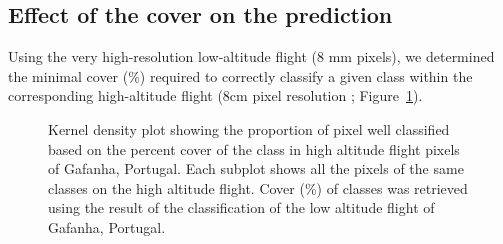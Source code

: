 \documentclass[
  number]{elsarticle}
\begin{document}
\subsection{Effect of the cover on the
prediction}\label{effect-of-the-cover-on-the-prediction}

Using the very high-resolution low-altitude flight (8 mm pixels), we
determined the minimal cover (\%) required to correctly classify a given
class within the corresponding high-altitude flight (8cm pixel
resolution ; Figure~\ref{fig-upscaling}).

\label{cell-fig-upscaling}
\begin{figure}[H]


\caption{\label{fig-upscaling}Kernel density plot showing the proportion
of pixel well classified based on the percent cover of the class in high
altitude flight pixels of Gafanha, Portugal. Each subplot shows all the
pixels of the same classes on the high altitude flight. Cover (\%) of
classes was retrieved using the result of the classification of the low
altitude flight of Gafanha, Portugal.}

\end{figure}%
\end{document}
